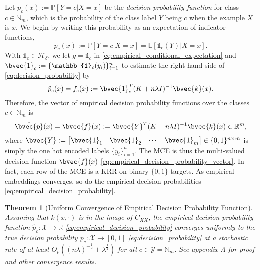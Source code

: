 \documentclass[twoside]{article}
\newtheorem{theorem}{Theorem}[section]
\begin{document}
		Let $p_{c}(x) := \mathbb{P}[Y = c | X = x]$ be the \textit{decision probability function} for class $c \in \mathbb{N}_{m}$, which is the probability of the class label $Y$ being $c$ when the example $X$ is $x$. We begin by writing this probability as an expectation of indicator functions,
		\begin{equation}
		p_{c}(x) := \mathbb{P}[Y = c | X = x] = \mathbb{E}[\mathbb{1}_{c}(Y) | X = x].
		\label{eq:decision_probability}
		\end{equation}	
		With $\mathbb{1}_{c} \in \mathcal{H}_{\delta}$, we let $g = \mathbb{1}_{c}$ in \eqref{eq:empirical_conditional_expectation} and $\bvec{1}_{c} := \{\mathbb{1}_{c}(y_{i})\}_{i = 1}^{n}$ to estimate the right hand side of \eqref{eq:decision_probability} by
		\begin{equation}
		\hat{p}_{c}(x) = f_{c}(x) := \bvec{1}_{c}^{T} (K + n \lambda I)^{-1} \bvec{k}(x).
		\label{eq:empirical_decision_probability}
		\end{equation}
		Therefore, the vector of empirical decision probability functions over the classes $c \in \mathbb{N}_{m}$ is
		\begin{equation}
		\hat{\bvec{p}}(x) = \bvec{f}(x) := \bvec{Y}^{T} (K + n \lambda I)^{-1} \bvec{k}(x) \in \mathbb{R}^{m},
		\label{eq:empirical_decision_probability_vector}
		\end{equation}
		where $\bvec{Y} := \begin{bmatrix} \bvec{1}_{1} & \bvec{1}_{2} & \cdots & \bvec{1}_{m} \end{bmatrix} \in \{0, 1\}^{n \times m}$ is simply the one hot encoded labels $\{y_{i}\}_{i = 1}^{n}$. The \gls{MCE} is thus the multi-valued decision function $\bvec{f}(x)$ \eqref{eq:empirical_decision_probability_vector}. In fact, each row of the \gls{MCE} is a \gls{KRR} \citep{friedman2001elements} on binary $\{0, 1\}$-targets. As empirical embeddings converges, so do the empirical decision probabilities \eqref{eq:empirical_decision_probability}.
		\begin{theorem}[Uniform Convergence of Empirical Decision Probability Function]
			\label{thm:probability_convergence_copy}
			Assuming that $k(x, \cdot)$ is in the image of $C_{XX}$, the empirical decision probability function $\hat{p}_{c} : \mathcal{X} \to \mathbb{R}$ \eqref{eq:empirical_decision_probability} converges uniformly to the true decision probability $p_{c} : \mathcal{X} \to [0, 1]$ \eqref{eq:decision_probability} at a stochastic rate of at least $O_{p}((n \lambda)^{-\frac{1}{2}} + \lambda^{\frac{1}{2}})$ for all $c \in \mathcal{Y} = \mathbb{N}_{m}$. See appendix A for proof and other convergence results.
		\end{theorem}
		
\end{document}
